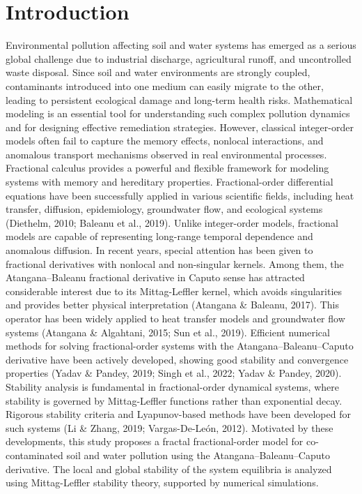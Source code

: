 \documentclass[10pt]{NSP1}
\begin{document}
\maketitle

\section{Introduction}

Environmental pollution affecting soil and water systems has emerged as a serious global challenge due to industrial discharge, agricultural runoff, and uncontrolled waste disposal. Since soil and water environments are strongly coupled, contaminants introduced into one medium can easily migrate to the other, leading to persistent ecological damage and long-term health risks. Mathematical modeling is an essential tool for understanding such complex pollution dynamics and for designing effective remediation strategies. However, classical integer-order models often fail to capture the memory effects, nonlocal interactions, and anomalous transport mechanisms observed in real environmental processes. Fractional calculus provides a powerful and flexible framework for modeling systems with memory and hereditary properties. Fractional-order differential equations have been successfully applied in various scientific fields, including heat transfer, diffusion, epidemiology, groundwater flow, and ecological systems (Diethelm, 2010; Baleanu et al., 2019). Unlike integer-order models, fractional models are capable of representing long-range temporal dependence and anomalous diffusion. In recent years, special attention has been given to fractional derivatives with nonlocal and non-singular kernels. Among them, the Atangana--Baleanu fractional derivative in Caputo sense has attracted considerable interest due to its Mittag-Leffler kernel, which avoids singularities and provides better physical interpretation (Atangana \& Baleanu, 2017). This operator has been widely applied to heat transfer models and groundwater flow systems (Atangana \& Algahtani, 2015; Sun et al., 2019). Efficient numerical methods for solving fractional-order systems with the Atangana--Baleanu--Caputo derivative have been actively developed, showing good stability and convergence properties (Yadav \& Pandey, 2019; Singh et al., 2022; Yadav \& Pandey, 2020). Stability analysis is fundamental in fractional-order dynamical systems, where stability is governed by Mittag-Leffler functions rather than exponential decay. Rigorous stability criteria and Lyapunov-based methods have been developed for such systems (Li \& Zhang, 2019; Vargas-De-León, 2012). Motivated by these developments, this study proposes a fractal fractional-order model for co-contaminated soil and water pollution using the Atangana--Baleanu--Caputo derivative. The local and global stability of the system equilibria is analyzed using Mittag-Leffler stability theory, supported by numerical simulations.
\end{document}
